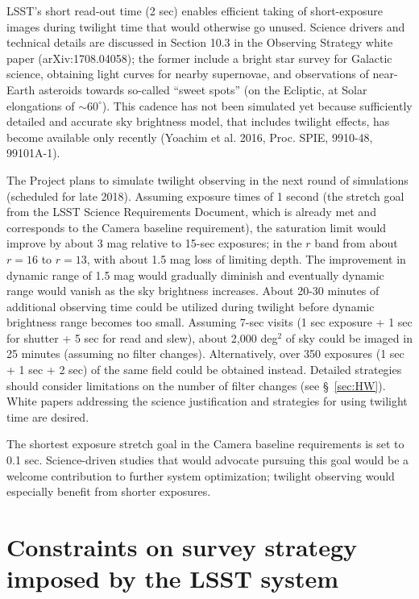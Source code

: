 \documentclass[DM,lsstdraft,toc,usenatbib]{lsstdoc}
\begin{document}
LSST's short read-out time (2 sec) enables efficient taking of short-exposure images during twilight time 
that would otherwise go unused. Science drivers and technical details are discussed in Section 10.3 in the 
Observing Strategy white paper (arXiv:1708.04058); the former include a bright star survey for Galactic
science, obtaining light curves for nearby supernovae, and observations of near-Earth asteroids towards
so-called ``sweet spots'' (on the Ecliptic, at Solar elongations of $\sim60^\circ$). This cadence has not 
been simulated yet because sufficiently detailed and accurate sky brightness model, that includes twilight 
effects, has become available only recently (Yoachim et al. 2016, Proc. SPIE, 9910-48, 99101A-1). 

The Project plans to simulate twilight observing in the next round of simulations (scheduled for late 2018). 
Assuming exposure times of 1 second (the stretch goal from the LSST Science Requirements Document, 
which is already met and corresponds to the Camera baseline requirement), the saturation limit would 
improve by about 3 mag relative to 15-sec exposures; in the $r$ band from about $r=16$ to $r=13$,
with about 1.5 mag loss of limiting depth. The improvement in dynamic range of 1.5 mag would gradually
diminish and eventually dynamic range would vanish as the sky brightness increases. About 20-30 minutes
of additional observing time could be utilized during twilight before dynamic brightness range becomes
too small. Assuming 7-sec visits (1 sec exposure + 1 sec for shutter + 5 sec for read and slew), about 
2,000 deg$^2$ of sky could be imaged in 25 minutes (assuming no filter changes). Alternatively, over 
350 exposures (1 sec + 1 sec + 2 sec) of the same field could be obtained instead.  Detailed strategies
should consider limitations on the number of filter changes (see \S~\ref{sec:HW}). 
White papers addressing the science justification and strategies for using twilight time are desired.

The shortest exposure stretch goal in the Camera baseline requirements is set to 0.1 sec. Science-driven
studies that would advocate pursuing this goal would be a welcome contribution to further system
optimization; twilight observing would especially benefit from shorter exposures. 
 

\section{Constraints on survey strategy imposed by the LSST system} 
\end{document}
